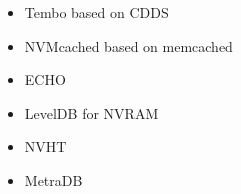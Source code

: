 \begin{itemize}
    \item Tembo based on CDDS \cite{venkataraman2011consistent}
    \item NVMcached based on memcached \cite{wu2016nvmcached}
    \item ECHO \cite{bailey2013exploring}
    \item LevelDB for NVRAM \cite{lersch2017analysis}
    \item NVHT \cite{zhou2016nvht}
    \item MetraDB \cite{marmol2016nonvolatile}
\end{itemize}
